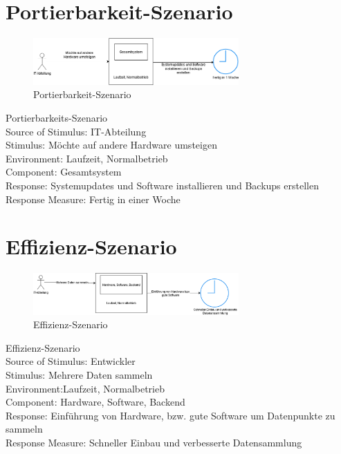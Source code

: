 \section{Portierbarkeit-Szenario}
\begin{figure}[tbh]
  \centering
  \includegraphics[width=0.7\textwidth]{Graphics/Portierbarkeit.png}
  \caption{Portierbarkeit-Szenario}
  \label{fig:Qualitaet4}
\end{figure}



Portierbarkeits-Szenario\\
Source of Stimulus: IT-Abteilung\\
Stimulus: Möchte auf andere Hardware umsteigen\\
Environment: Laufzeit, Normalbetrieb\\
Component: Gesamtsystem\\
Response: Systemupdates und Software installieren und Backups erstellen \\
Response Measure: Fertig in einer Woche\\



\section{Effizienz-Szenario}
\begin{figure}[tbh]
  \centering
  \includegraphics[width=0.7\textwidth]{Graphics/Effizienz.png}
  \caption{Effizienz-Szenario}
  \label{fig:Qualitaet5}
\end{figure}



Effizienz-Szenario\\
Source of Stimulus: Entwickler\\
Stimulus: Mehrere Daten sammeln\\
Environment:Laufzeit, Normalbetrieb\\
Component: Hardware, Software, Backend\\
Response: Einführung von Hardware, bzw. gute Software um Datenpunkte zu sammeln\\
Response Measure: Schneller Einbau und verbesserte Datensammlung\\



